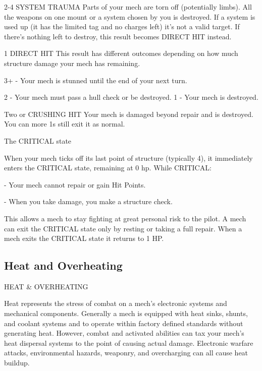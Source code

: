  2-4             SYSTEM TRAUMA            Parts of your mech are torn off (potentially limbs). All the weapons  
                                          on one mount or a system chosen by you is destroyed. If a system  
                                          is used up (it has the limited tag and no charges left) it’s not a valid  
                                          target. If there’s nothing left to destroy, this result becomes DIRECT  
                                          HIT instead. 

 1               DIRECT HIT               This result has different outcomes depending on how much  
                                          structure damage your mech has remaining.
 
                                          3+ - Your mech is stunned until the end of your next turn.
 
                                          2 - Your mech must pass a hull check or be destroyed.  
                                          1 - Your mech is destroyed. 

 Two or          CRUSHING HIT             Your mech is damaged beyond repair and is destroyed. You can  
 more 1s                                  still exit it as normal. 

                                              The CRITICAL state
 

When your mech ticks off its last point of structure (typically 4), it immediately enters the  
CRITICAL state, remaining at 0 hp. While CRITICAL:
 
             -    Your mech cannot repair or gain Hit Points.
 
             -    When you take damage, you make a structure check.
 
This allows a mech to stay fighting at great personal risk to the pilot. A mech can exit the  
CRITICAL state only by resting or taking a full repair. When a mech exits the CRITICAL state it  
returns to 1 HP.
 
\subsection{Heat and Overheating}

  HEAT \& OVERHEATING  

Heat represents the stress of combat on a mech’s electronic systems and mechanical  
components. Generally a mech is equipped with heat sinks, shunts, and coolant systems and to  
operate within factory defined standards without generating heat. However, combat and  
activated abilities can tax your mech’s heat dispersal systems to the point of causing actual  
damage. Electronic warfare attacks, environmental hazards, weaponry, and overcharging can all  
cause heat buildup.
 

